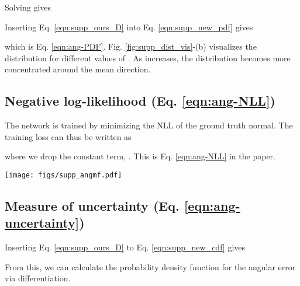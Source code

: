 \documentclass[10pt,twocolumn,letterpaper]{article}
\begin{document}
\noindent
Solving  gives



\noindent
Inserting Eq. \ref{eqn:supp_ours_D} into Eq. \ref{eqn:supp_new_pdf} gives 



\noindent
which is Eq. \ref{eqn:ang-PDF}. Fig. \ref{fig:supp_dist_vis}-(b) visualizes the distribution for different values of . As  increases, the distribution becomes more concentrated around the mean direction. 

\subsection{Negative log-likelihood (Eq. \ref{eqn:ang-NLL})}

The network is trained by minimizing the NLL of the ground truth normal. The training loss can thus be written as



\noindent
where we drop the constant term, . This is Eq. \ref{eqn:ang-NLL} in the paper.

\begin{figure*}[t]
\begin{center}
\texttt{[image: figs/supp\_angmf.pdf]}
\end{center}
\caption{(a) The axes orientation used for the integrations in Eq. \ref{eqn:supp_new_cdf} and Eq. \ref{eqn:supp_exp_error}. The mean direction  is aligned with the -axis, and is thus excluded in the integration. (b) Visualization of Eq. \ref{eqn:supp_new_pdf2} for different values of .  determines how concentrated the distribution is towards the mean direction. (c) Eq. \ref{eqn:supp_ours_cdf2}, Eq. \ref{eqn:supp_alpha_pdf} and Eq. \ref{eqn:supp_exp_error} plotted for different values of . The expected error decreases as the confidence  increases.}
\label{fig:supp_dist_vis}
\end{figure*}

\subsection{Measure of uncertainty (Eq. \ref{eqn:ang-uncertainty})}

Inserting Eq. \ref{eqn:supp_ours_D} to Eq. \ref{eqn:supp_new_cdf} gives



\noindent
From this, we can calculate the probability density function for the angular error  via differentiation.
\end{document}
